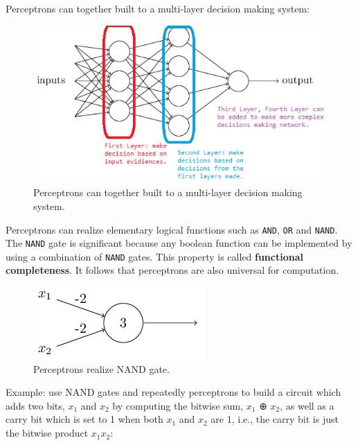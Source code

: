\documentclass[]{book}
\begin{document}
Perceptrons can together built to a multi-layer decision making system:

\begin{figure}

{\centering \includegraphics[width=0.75\linewidth]{fig/01_tikz01} 

}

\caption{Perceptrons can together built to a multi-layer decision making system.}\label{fig:nnhd-pptm}
\end{figure}

Perceptrons can realize elementary logical functions such as
\texttt{AND}, \texttt{OR} and \texttt{NAND}. The \texttt{NAND} gate is
significant because any boolean function can be implemented by using a
combination of \texttt{NAND} gates. This property is called
\textbf{functional completeness}. It follows that perceptrons are also
universal for computation.

\begin{figure}

{\centering \includegraphics[width=0.4\linewidth]{fig/01_tikz02} 

}

\caption{Perceptrons realize NAND gate.}\label{fig:nnhd-pptn-nand}
\end{figure}

Example: use NAND gates and repeatedly perceptrons to build a circuit
which adds two bits, \(x_1\) and \(x_2\) by computing the bitwise sum,
\(x_1\) ⊕ \(x_2\), as well as a carry bit which is set to 1 when both
\(x_1\) and \(x_2\) are 1, i.e., the carry bit is just the bitwise
product \(x_1x_2\):
\end{document}
